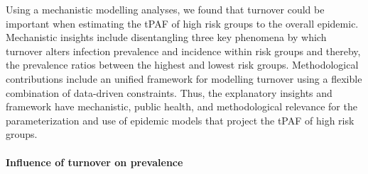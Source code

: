Using a mechanistic modelling analyses, 
we found that turnover could be important 
when estimating the tPAF
of high risk groups to the overall epidemic.
Mechanistic insights include disentangling 
three key phenomena by which turnover 
alters infection prevalence and incidence within risk groups and 
thereby, the prevalence ratios between the highest and lowest risk groups.
Methodological contributions include an unified 
framework for modelling turnover 
using a flexible combination of data-driven constraints.
Thus, the explanatory insights and framework
have mechanistic, public health, and methodological relevance 		%
for the parameterization
and use of epidemic models that project the tPAF of high risk groups.

\paragraph{Influence of turnover on prevalence}				%

